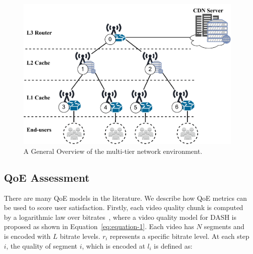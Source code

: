 \begin{figure}
    \centering
    \includegraphics[width=\linewidth]{images/qoe-multi-level-2.pdf}
    \caption{A General Overview of the multi-tier network environment.}
    \label{fig:exp-setup-scenario}
\end{figure}



\subsection{QoE Assessment}

There are many QoE models in the literature. We describe how QoE metrics can be used to score user satisfaction. Firstly, each video quality chunk is computed by a logarithmic law over bitrates~\cite{Zhang:TransM13}, where a video quality model for DASH is proposed as shown in Equation~\ref{eq:equation-1}. Each video has $N$ segments and is encoded with $L$ bitrate levels. $r_i$ represents a specific bitrate level. At each step $i$, the quality of segment $i$, which is encoded at $l_i$ is defined as:

